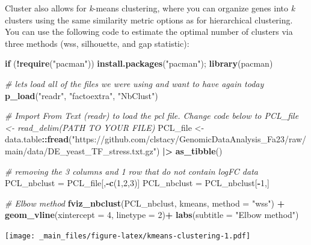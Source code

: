 \documentclass[
]{book}
\newenvironment{Shaded}{\begin{snugshade}}{\end{snugshade}}
\newcommand{\AttributeTok}[1]{\textcolor[rgb]{0.13,0.29,0.53}{#1}}
\newcommand{\CommentTok}[1]{\textcolor[rgb]{0.56,0.35,0.01}{\textit{#1}}}
\newcommand{\ControlFlowTok}[1]{\textcolor[rgb]{0.13,0.29,0.53}{\textbf{#1}}}
\newcommand{\DecValTok}[1]{\textcolor[rgb]{0.00,0.00,0.81}{#1}}
\newcommand{\FunctionTok}[1]{\textcolor[rgb]{0.13,0.29,0.53}{\textbf{#1}}}
\newcommand{\NormalTok}[1]{#1}
\newcommand{\OtherTok}[1]{\textcolor[rgb]{0.56,0.35,0.01}{#1}}
\newcommand{\SpecialCharTok}[1]{\textcolor[rgb]{0.81,0.36,0.00}{\textbf{#1}}}
\newcommand{\StringTok}[1]{\textcolor[rgb]{0.31,0.60,0.02}{#1}}
\begin{document}
Cluster also allows for \emph{k}-means clustering, where you can organize genes into \emph{k} clusters using the same similarity metric options as for hierarchical clustering. You can use the following code to estimate the optimal number of clusters via three methods (wss, silhouette, and gap statistic):

\begin{Shaded}
\begin{Highlighting}[]
\ControlFlowTok{if}\NormalTok{ (}\SpecialCharTok{!}\FunctionTok{require}\NormalTok{(}\StringTok{"pacman"}\NormalTok{)) }\FunctionTok{install.packages}\NormalTok{(}\StringTok{"pacman"}\NormalTok{); }\FunctionTok{library}\NormalTok{(pacman)}

\CommentTok{\# let\textquotesingle{}s load all of the files we were using and want to have again today}
\FunctionTok{p\_load}\NormalTok{(}\StringTok{"readr"}\NormalTok{, }\StringTok{"factoextra"}\NormalTok{, }\StringTok{"NbClust"}\NormalTok{) }

\CommentTok{\# Import From Text (readr) to load the pcl file. Change code below to PCL\_file \textless{}{-} read\_delim(PATH TO YOUR FILE)}
\NormalTok{PCL\_file }\OtherTok{\textless{}{-}}\NormalTok{ data.table}\SpecialCharTok{::}\FunctionTok{fread}\NormalTok{(}\StringTok{"https://github.com/clstacy/GenomicDataAnalysis\_Fa23/raw/main/data/DE\_yeast\_TF\_stress.txt.gz"}\NormalTok{) }\SpecialCharTok{|\textgreater{}} \FunctionTok{as\_tibble}\NormalTok{()}

\CommentTok{\# removing the 3 columns and 1 row that do not contain logFC data}
\NormalTok{PCL\_nbclust }\OtherTok{=}\NormalTok{ PCL\_file[,}\SpecialCharTok{{-}}\FunctionTok{c}\NormalTok{(}\DecValTok{1}\NormalTok{,}\DecValTok{2}\NormalTok{,}\DecValTok{3}\NormalTok{)]}
\NormalTok{PCL\_nbclust }\OtherTok{=}\NormalTok{ PCL\_nbclust[}\SpecialCharTok{{-}}\DecValTok{1}\NormalTok{,]}


\CommentTok{\# Elbow method}
\FunctionTok{fviz\_nbclust}\NormalTok{(PCL\_nbclust, kmeans, }\AttributeTok{method =} \StringTok{"wss"}\NormalTok{) }\SpecialCharTok{+}
    \FunctionTok{geom\_vline}\NormalTok{(}\AttributeTok{xintercept =} \DecValTok{4}\NormalTok{, }\AttributeTok{linetype =} \DecValTok{2}\NormalTok{)}\SpecialCharTok{+}
  \FunctionTok{labs}\NormalTok{(}\AttributeTok{subtitle =} \StringTok{"Elbow method"}\NormalTok{)}
\end{Highlighting}
\end{Shaded}

\texttt{[image: \_main\_files/figure-latex/kmeans-clustering-1.pdf]}
\end{document}
